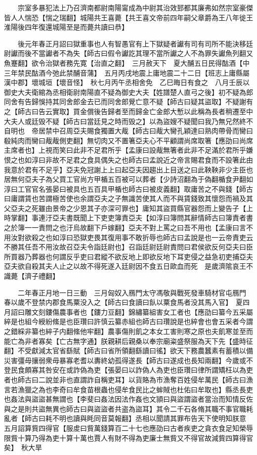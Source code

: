 　　宗室多暴犯法上乃召濟南都尉南陽甯成為中尉其治效郅都其廉弗如然宗室豪傑皆人人惴恐【惴之瑞翻】城陽共王喜薨【共王喜文帝前四年嗣父章爵為王八年徙王淮陽後四年復還城陽至是而薨共讀曰恭】

　　後元年春正月詔曰獄重事也人有智愚官有上下獄疑者讞有司有司所不能決移廷尉讞而後不當讞者不為失【師古曰假令讞訖其理不當所讞之人不為罪失讞魚列翻又魚蹇翻】欲令治獄者務先寛【治直之翻】　三月赦天下　夏大酺五日民得酤酒【中三年禁民酤酒今弛此禁酺音蒲】　五月丙戌地震上庸地震二十二日【班志上庸縣屬漢中郡】壞城垣【壞音怪】　秋七月丙午丞相舍免　乙巳晦日有食之　八月壬辰以御史大夫衛綰為丞相衛尉南陽直不疑為御史大夫【姓譜楚人直弓之後】初不疑為郎同舍有告歸悞持其同舍郎金去已而同舍郎覺亡意不疑【師古曰疑其盜取】不疑謝有之【師古曰告云實取】買金償後告歸者至而歸金亡金郎大慙以此稱為長者稍遷至中大夫人或廷毁不疑【師古曰當廷見之時而毁之】以為盜嫂不疑聞曰我乃無兄然終不自明也　帝居禁中召周亞夫賜食獨置大胾【師古曰胾大臠孔穎達曰熟肉帶骨而臠曰殽純肉而臠曰胾胾側吏翻】無切肉又不置箸亞夫心不平顧謂尚席取箸【應劭曰尚席主席者也】上視而笑曰此非不足君所乎【孟康曰設胾無箸者此非不足滿於君所乎嫌恨之也如淳曰非故不足君之食具偶失之也師古曰孟說近之帝言賜君食而不設箸此由我意於君有不足乎】亞夫免冠謝上上曰起亞夫因趨出上目送之曰此鞅鞅非少主臣也居無何亞夫子為父買工官尚方甲楯五百被可以葬者【少詩沼翻為于偽翻楯食尹翻如淳曰工官官名張晏曰被具也五百具甲楯也師古曰被皮義翻】取庸苦之不與錢【師古曰庸謂賃也苦謂極苦使也余謂亞夫之子無識苦使其人而不與賃錢致其懷怨而禍及其父亞夫之死雖由景帝之少恩其子亦深可罪也】庸知其盜買縣官器怨而上變告子【上時掌翻】事連汙亞夫書既聞上下吏吏簿責亞夫【如淳曰簿問其辭情師古曰簿責者書之於簿一一責問之也汙烏故翻下戶嫁翻】亞夫不對上罵之曰吾不用也【孟康曰言不用汝對欲殺之也如淳曰恐獄吏畏其復用事不敢折辱也師古曰孟說是也一云帝責吏云不勝其任吾不用汝故召亞夫令詣廷尉也】召詣廷尉廷尉責問曰君侯欲反何亞夫曰臣所買器乃葬器也何謂反乎吏曰君縱不欲反地上即欲反地下耳吏侵之益急初吏捕亞夫亞夫欲自殺其夫人止之以故不得死遂入廷尉因不食五日歐血而死　是歲濟隂哀王不識薨【濟子禮翻】

　　二年春正月地一日三動　三月匈奴入鴈門太守馮敬與戰死發車騎材官屯鴈門　春以歲不登禁内郡食馬粟没入之【師古曰食讀曰飤以粟食馬者没其馬入官】　夏四月詔曰雕文刻鏤傷農事者也【鏤力豆翻】錦繡纂組害女工者也【應劭曰纂今五采屬綷是也組今綬紛絛是也臣瓚曰許慎云纂赤組也師古曰瓚說是也綷會也會五采者今謂之錯綵非纂也綷子内翻絛他牢翻】農事傷則飢之本女工害則寒之原也夫飢寒並至而能亡為非者寡矣【亡古無字通】朕親耕后親桑以奉宗廟粢盛祭服為天下先【盛時征翻】不受獻減太官省繇賦【師古曰省所領翻繇讀曰徭】欲天下務農蠶素有蓄積以備災害彊毋攘弱衆毋暴寡老耆以夀終幼孤得遂長【師古曰遂成也長知兩翻】今歲或不登民食頗寡其咎安在或詐偽為吏【張晏曰以詐偽人為吏也臣瓚曰律所謂矯枉以為吏者也師古曰二說並非也直謂詐自稱吏耳】以貨賂為市漁奪百姓侵牟萬民【師古曰漁言若漁獵之為也李奇曰牟食苗根蟲也侵牟食民比之蛑賊也杜佑曰牟取也】縣丞長吏也姦法與盜盜甚無謂也【李斐曰姦法因法作姦也文頴曰與盜謂盜者當治而知情反佐與之是則共盜無異也師古曰與盜盜者共盗為盜耳】其令二千石各脩其職不事官職耗亂者【師古曰耗不明也讀與眊同音莫報翻】丞相以聞請其罪布告天下使明知朕意　五月詔算貲四得官【服䖍曰貲萬錢算百二十七也應劭曰古者疾吏之貪衣食足知榮辱限貲十算乃得為吏十算十萬也賈人有財不得為吏廉士無貲又不得官故減貲四算得官矣】　秋大旱

